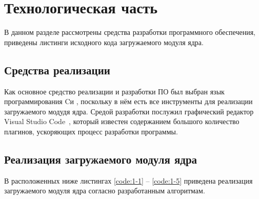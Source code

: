 \section{\large Технологическая часть}

В  данном  разделе  рассмотрены  средства  разработки  программного
обеспечения, приведены листинги исходного кода загружаемого модуля ядра.

\subsection{Средства реализации}
Как  основное  средство  реализации  и  разработки  ПО  был  выбран  язык
программирования  Cи \cite{c-lang}, поскольку в нём есть все инструменты для реализации загружаемого модудя ядра.
Средой разработки  послужил  графический  редактор  Visual  Studio  Code~\cite{vscode},  который известен  содержанием  большого  количество  плагинов,  ускоряющих  процесс разработки  программы.


\subsection{Реализация загружаемого модуля ядра}

В  расположенных  ниже  листингах \ref{code:1-1} -- \ref{code:1-5} приведена реализация загружаемого модуля ядра согласно разработанным алгоритмам.

\clearpage

\begin{figure}[H]
\end{figure}

\begin{figure}[H]
\end{figure}

